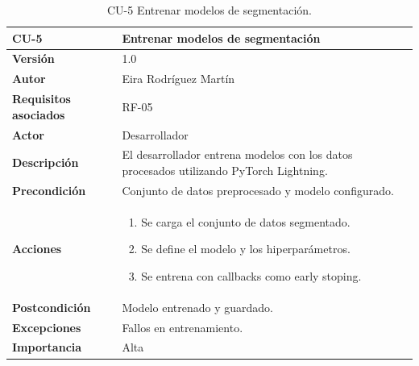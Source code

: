 \begin{table}[!h]
	\centering
	\begin{tabularx}{\linewidth}{ p{} p{} }
		\toprule
		\textbf{CU-5}    & \textbf{Entrenar modelos de segmentación}\\
		\toprule
		\textbf{Versión}              & 1.0    \\
		\textbf{Autor}                & Eira Rodríguez Martín \\
		\textbf{Requisitos asociados} & RF-05 \\
        \textbf{Actor}                & Desarrollador \\
		\textbf{Descripción}          & El desarrollador entrena modelos con los datos procesados utilizando PyTorch Lightning.\\
		\textbf{Precondición}         & Conjunto de datos preprocesado y modelo configurado. \\
		\textbf{Acciones}             &
		\begin{enumerate}
			\def\labelenumi{\arabic{enumi}.}
			\tightlist
			\item Se carga el conjunto de datos segmentado.
			\item Se define el modelo y los hiperparámetros.
            \item Se entrena con callbacks como early stoping.
		\end{enumerate}\\
		\textbf{Postcondición}        & Modelo entrenado y guardado. \\
		\textbf{Excepciones}          & Fallos en entrenamiento. \\
		\textbf{Importancia}          & Alta \\
		\bottomrule
	\end{tabularx}
	\caption{CU-5 Entrenar modelos de segmentación.}
\end{table}

